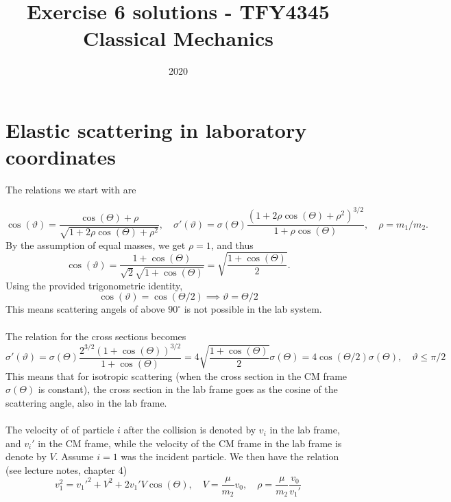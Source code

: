 \documentclass{article}
\title{Exercise 6 solutions - TFY4345 Classical Mechanics}
\date{2020}
\begin{document}
    \maketitle

    \section{Elastic scattering in laboratory coordinates}
    The relations we start with are

    \begin{equation*}
        \cos(\vartheta) = \frac{\cos(\Theta) + \rho}{\sqrt{1 + 2\rho \cos(\Theta) + \rho^2}}, \quad \sigma'(\vartheta) = \sigma (\Theta) \frac{(1 + 2\rho \cos(\Theta) + \rho^2)^{3/2}}{1 + \rho \cos(\Theta)}, \quad \rho = m_1 / m_2.
    \end{equation*}
    By the assumption of equal masses, we get $\rho = 1$, and thus
    \begin{equation*}
        \cos(\vartheta) = \frac{1 + \cos(\Theta)}{\sqrt 2 \sqrt{1 + \cos(\Theta)}} = \sqrt{\frac{1 + \cos(\Theta)}{2}}.
    \end{equation*}
    Using the provided trigonometric identity, 
    \begin{equation*}
        \cos(\vartheta) = \cos(\Theta / 2) \implies \vartheta = \Theta/2
    \end{equation*}
    This means scattering angels of above $90^\circ$ is not possible in the lab system.
    \\
    \\
    The relation for the cross sections becomes
    \begin{equation*}
        \sigma'(\vartheta) = \sigma(\Theta) \frac{2^{3/2}(1 + \cos(\Theta))^{3/2}}{1 + \cos(\Theta)} = 4 \sqrt{\frac{ 1 + \cos(\Theta)}{2}} \sigma(\Theta) = 4 \cos(\Theta/2) \sigma(\Theta), \quad \vartheta \leq \pi/2
    \end{equation*}
    This means that for isotropic scattering (when the cross section in the CM frame $\sigma(\Theta)$ is constant), the cross section in the lab frame goes as the cosine of the scattering angle, also in the lab frame.
    \\
    \\
    The velocity of of particle $i$ after the collision is denoted by $v_i$ in the lab frame, and $v_i'$ in the CM frame, while the velocity of the CM frame in the lab frame is denote by $V$. Assume $i=1$ was the incident particle. We then have the relation (see lecture notes, chapter 4)
    \begin{equation*}
        v_1^2 = v_1'^2 + V^2 + 2v_1'V \cos(\Theta), \quad V = \frac{\mu}{m_2} v_0, \quad \rho = \frac{\mu}{m_2}\frac{v_0}{v_1'}
    \end{equation*}
\end{document}
